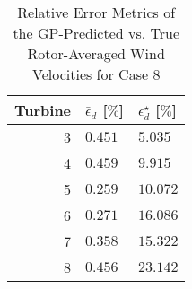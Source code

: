 \begin{table}[!ht]
\centering
\caption{Relative Error Metrics of the \ac{GP}-Predicted vs. True Rotor-Averaged Wind Velocities for Case 8}
\label{tab:rel_error}
\begin{tabular}{rll}
\toprule
 Turbine & $\bar{\epsilon}_d$ [$\%$] & $\epsilon^\star_d$ [$\%$] \\
\midrule
       3 &  \cellcolor{Gray3}$0.451$ &                   $5.035$ \\
       4 &  \cellcolor{Gray1}$0.459$ &                   $9.915$ \\
       5 &  \cellcolor{Gray6}$0.259$ &                  $10.072$ \\
       6 &  \cellcolor{Gray5}$0.271$ &                  $16.086$ \\
       7 &  \cellcolor{Gray4}$0.358$ &                  $15.322$ \\
       8 &  \cellcolor{Gray2}$0.456$ &                  $23.142$ \\
\bottomrule
\end{tabular}
\end{table}
